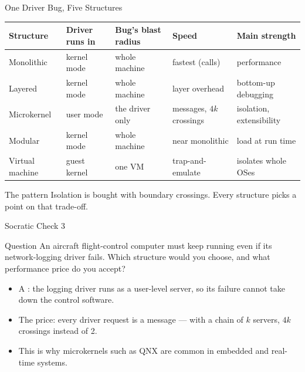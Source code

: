\documentclass[aspectratio=169]{beamer}
\begin{document}
\begin{frame}{One Driver Bug, Five Structures}
  \centering
  \footnotesize
  \renewcommand{\arraystretch}{1.3}
  \begin{tabular}{L{0.14\textwidth}L{0.15\textwidth}L{0.16\textwidth}L{0.17\textwidth}L{0.18\textwidth}}
    \textbf{Structure} & \textbf{Driver runs in} & \textbf{Bug's blast radius}
      & \textbf{Speed} & \textbf{Main strength} \\
    \hline
    Monolithic & kernel mode & whole machine & fastest (calls)
      & performance \\
    Layered & kernel mode & whole machine & layer overhead
      & bottom-up debugging \\
    Microkernel & user mode & the driver only & messages, $4k$ crossings
      & isolation, extensibility \\
    Modular & kernel mode & whole machine & near monolithic
      & load at run time \\
    Virtual machine & guest kernel & one VM & trap-and-emulate
      & isolates whole OSes \\
  \end{tabular}
  \vspace{0.3cm}
  \begin{alertblock}{The pattern}
    Isolation is bought with boundary crossings. Every structure picks a point
    on that trade-off.
  \end{alertblock}
\end{frame}

\begin{frame}{Socratic Check 3}
  \begin{block}{Question}
    An aircraft flight-control computer must keep running even if its
    network-logging driver fails. Which structure would you choose, and what
    performance price do you accept?
  \end{block}
  \vspace{0.25cm}
  \begin{itemize}
    \item A : the logging driver runs as a user-level server,
      so its failure cannot take down the control software.
    \item The price: every driver request is a message --- with a chain of $k$
      servers, $4k$ crossings instead of 2.
    \item This is why microkernels such as QNX are common in embedded and
      real-time systems.
  \end{itemize}
\end{frame}
\end{document}
